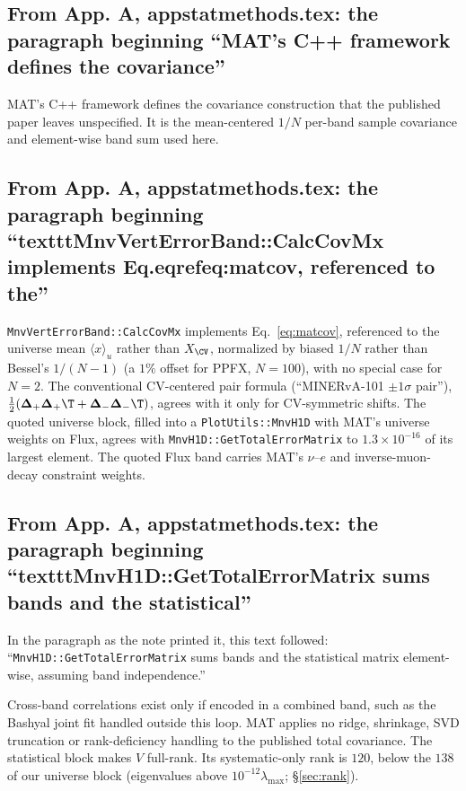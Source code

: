 \subsection{From App. A, appstatmethods.tex: the paragraph beginning ``MAT's C++ framework defines the covariance''}
MAT's C++ framework defines the covariance construction that the published paper leaves unspecified. It is the mean-centered $1/N$ per-band sample covariance and element-wise band sum used here.

\subsection{From App. A, appstatmethods.tex: the paragraph beginning ``textttMnvVertErrorBand::CalcCovMx implements Eq.eqrefeq:matcov, referenced to the''}
\texttt{MnvVertErrorBand::CalcCovMx} implements Eq.~\eqref{eq:matcov}, referenced to the universe mean $\langle x\rangle_{u}$ rather than $X_{\CV}$, normalized by biased $1/N$ rather than Bessel's $1/(N-1)$ (a $1\%$ offset for PPFX, $N=100$), with no special case for $N=2$. The conventional CV-centered pair formula (``MINERvA-101 $\pm1\sigma$ pair''), $\tfrac12(\boldsymbol{\Delta}_{+}\boldsymbol{\Delta}_{+}\T + \boldsymbol{\Delta}_{-}\boldsymbol{\Delta}_{-}\T)$, agrees with it only for CV-symmetric shifts. The quoted universe block, filled into a \texttt{PlotUtils::MnvH1D} with MAT's universe weights on Flux, agrees with \texttt{MnvH1D::GetTotalErrorMatrix} to $1.3\times10^{-16}$ of its largest element. The quoted Flux band carries MAT's $\nu$--$e$ and inverse-muon-decay constraint weights.

\subsection{From App. A, appstatmethods.tex: the paragraph beginning ``textttMnvH1D::GetTotalErrorMatrix sums bands and the statistical''}
In the paragraph as the note printed it, this text followed: ``\texttt{MnvH1D::GetTotalErrorMatrix} sums bands and the statistical matrix element-wise, assuming band independence.''\par
Cross-band correlations exist only if encoded in a combined band, such as the Bashyal joint fit handled outside this loop. MAT applies no ridge, shrinkage, SVD truncation or rank-deficiency handling to the published total covariance. The statistical block makes $V$ full-rank. Its systematic-only rank is $120$, below the $138$ of our universe block (eigenvalues above $10^{-12}\lambda_{\max}$; \S\ref{sec:rank}).

